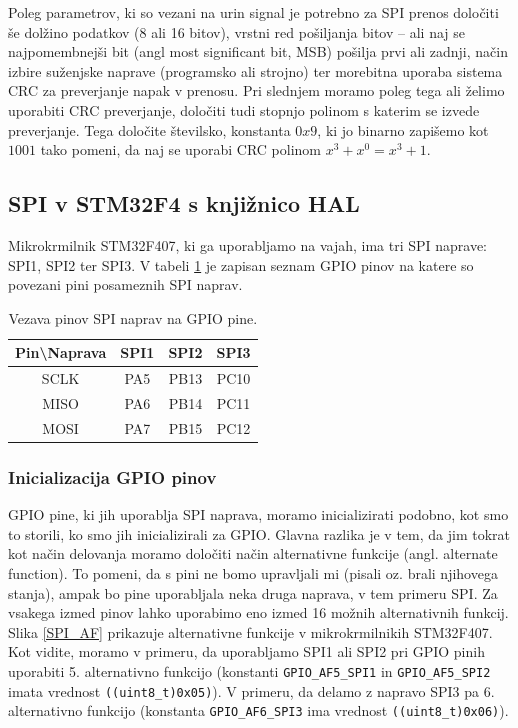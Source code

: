 \documentclass[12pt,letterpaper]{article}
\begin{document}
Poleg parametrov, ki so vezani na urin signal je potrebno za SPI prenos določiti še dolžino podatkov (8 ali 16 bitov), vrstni red pošiljanja bitov -- ali naj se najpomembnejši bit (angl most significant bit, MSB) pošilja prvi ali zadnji, način izbire suženjske naprave (programsko ali strojno) ter morebitna uporaba sistema CRC za preverjanje napak v prenosu. Pri slednjem moramo poleg tega ali želimo uporabiti CRC preverjanje, določiti tudi stopnjo polinom s katerim se izvede preverjanje. Tega določite številsko, konstanta $0x9$, ki jo binarno zapišemo kot $1001$ tako pomeni, da naj se uporabi CRC polinom $x^3 + x^0 = x^3 + 1$.


\subsection*{SPI v STM32F4 s knjižnico HAL}

Mikrokrmilnik STM32F407, ki ga uporabljamo na vajah, ima tri SPI naprave: SPI1, SPI2 ter SPI3. V tabeli \ref{SPIpinsTable} je zapisan seznam GPIO pinov na katere so povezani pini posameznih SPI naprav.

\begin{table}[ht!]
    \caption{Vezava pinov SPI naprav na GPIO pine.}
    \begin{center}
        \begin{tabular}{c|c|c|c}
            \textbf{Pin\textbackslash{}Naprava} & \textbf{SPI1} & \textbf{SPI2} & \textbf{SPI3} \\ \hline
            SCLK & PA5 & PB13 & PC10 \\ \hline
            MISO & PA6 & PB14 & PC11 \\ \hline
            MOSI  & PA7 & PB15 & PC12  \\
        \end{tabular}
    \end{center}
    \label{SPIpinsTable}
\end{table}

\subsubsection*{Inicializacija GPIO pinov}

GPIO pine, ki jih uporablja SPI naprava, moramo inicializirati podobno, kot smo to storili, ko smo jih inicializirali za GPIO. Glavna razlika je v tem, da jim tokrat kot način delovanja moramo določiti način alternativne funkcije (angl. alternate function). To pomeni, da s pini ne bomo upravljali mi (pisali oz. brali njihovega stanja), ampak bo pine uporabljala neka druga naprava, v tem primeru SPI. Za vsakega izmed pinov lahko uporabimo eno izmed 16 možnih alternativnih funkcij. Slika \ref{SPI_AF} prikazuje alternativne funkcije v mikrokrmilnikih STM32F407. Kot vidite, moramo v primeru, da uporabljamo SPI1 ali SPI2 pri GPIO pinih uporabiti 5. alternativno funkcijo (konstanti \texttt{GPIO\_AF5\_SPI1} in \texttt{GPIO\_AF5\_SPI2} imata vrednost \texttt{((uint8\_t)0x05)}). V primeru, da delamo z napravo SPI3 pa 6. alternativno funkcijo (konstanta \texttt{GPIO\_AF6\_SPI3} ima vrednost \texttt{((uint8\_t)0x06)}).
\end{document}
